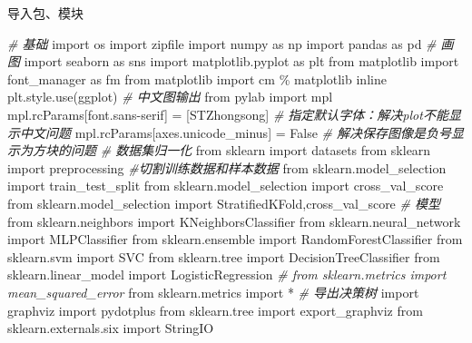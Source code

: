 \documentclass[
]{article}
\author{}
\date{}
\newenvironment{Shaded}{}{}
\newcommand{\CommentTok}[1]{\textcolor[rgb]{0.38,0.63,0.69}{\textit{#1}}}
\newcommand{\ImportTok}[1]{#1}
\newcommand{\NormalTok}[1]{#1}
\newcommand{\OperatorTok}[1]{\textcolor[rgb]{0.40,0.40,0.40}{#1}}
\newcommand{\StringTok}[1]{\textcolor[rgb]{0.25,0.44,0.63}{#1}}
\newcommand{\VariableTok}[1]{\textcolor[rgb]{0.10,0.09,0.49}{#1}}
\begin{document}
导入包、模块

\begin{Shaded}
\begin{Highlighting}[]
\CommentTok{\# 基础}
\ImportTok{import}\NormalTok{ os}
\ImportTok{import}\NormalTok{ zipfile}
\ImportTok{import}\NormalTok{ numpy }\ImportTok{as}\NormalTok{ np}
\ImportTok{import}\NormalTok{ pandas }\ImportTok{as}\NormalTok{ pd}
\CommentTok{\# 画图}
\ImportTok{import}\NormalTok{ seaborn }\ImportTok{as}\NormalTok{ sns}
\ImportTok{import}\NormalTok{ matplotlib.pyplot }\ImportTok{as}\NormalTok{ plt}
\ImportTok{from}\NormalTok{ matplotlib }\ImportTok{import}\NormalTok{ font\_manager }\ImportTok{as}\NormalTok{ fm}
\ImportTok{from}\NormalTok{ matplotlib }\ImportTok{import}\NormalTok{ cm}
\OperatorTok{\%}\NormalTok{ matplotlib inline}
\NormalTok{plt.style.use(}\StringTok{\textquotesingle{}ggplot\textquotesingle{}}\NormalTok{)}
\CommentTok{\# 中文图输出}
\ImportTok{from}\NormalTok{ pylab }\ImportTok{import}\NormalTok{ mpl}
\NormalTok{mpl.rcParams[}\StringTok{\textquotesingle{}font.sans{-}serif\textquotesingle{}}\NormalTok{] }\OperatorTok{=}\NormalTok{ [}\StringTok{\textquotesingle{}STZhongsong\textquotesingle{}}\NormalTok{]    }\CommentTok{\# 指定默认字体：解决plot不能显示中文问题}
\NormalTok{mpl.rcParams[}\StringTok{\textquotesingle{}axes.unicode\_minus\textquotesingle{}}\NormalTok{] }\OperatorTok{=} \VariableTok{False}           \CommentTok{\# 解决保存图像是负号\textquotesingle{}{-}\textquotesingle{}显示为方块的问题}
\CommentTok{\# 数据集归一化}
\ImportTok{from}\NormalTok{ sklearn }\ImportTok{import}\NormalTok{ datasets}
\ImportTok{from}\NormalTok{ sklearn }\ImportTok{import}\NormalTok{ preprocessing}
\CommentTok{\#切割训练数据和样本数据}
\ImportTok{from}\NormalTok{ sklearn.model\_selection }\ImportTok{import}\NormalTok{ train\_test\_split}
\ImportTok{from}\NormalTok{ sklearn.model\_selection }\ImportTok{import}\NormalTok{ cross\_val\_score}
\ImportTok{from}\NormalTok{ sklearn.model\_selection }\ImportTok{import}\NormalTok{ StratifiedKFold,cross\_val\_score}
\CommentTok{\# 模型}
\ImportTok{from}\NormalTok{ sklearn.neighbors }\ImportTok{import}\NormalTok{ KNeighborsClassifier}
\ImportTok{from}\NormalTok{ sklearn.neural\_network }\ImportTok{import}\NormalTok{ MLPClassifier}
\ImportTok{from}\NormalTok{ sklearn.ensemble }\ImportTok{import}\NormalTok{ RandomForestClassifier}
\ImportTok{from}\NormalTok{ sklearn.svm }\ImportTok{import}\NormalTok{ SVC}
\ImportTok{from}\NormalTok{ sklearn.tree }\ImportTok{import}\NormalTok{ DecisionTreeClassifier}
\ImportTok{from}\NormalTok{ sklearn.linear\_model }\ImportTok{import}\NormalTok{ LogisticRegression}
\CommentTok{\# from sklearn.metrics import mean\_squared\_error}
\ImportTok{from}\NormalTok{ sklearn.metrics }\ImportTok{import} \OperatorTok{*}
\CommentTok{\# 导出决策树}
\ImportTok{import}\NormalTok{ graphviz}
\ImportTok{import}\NormalTok{ pydotplus}
\ImportTok{from}\NormalTok{ sklearn.tree }\ImportTok{import}\NormalTok{ export\_graphviz}
\ImportTok{from}\NormalTok{ sklearn.externals.six }\ImportTok{import}\NormalTok{ StringIO}
\end{Highlighting}
\end{Shaded}
\end{document}
